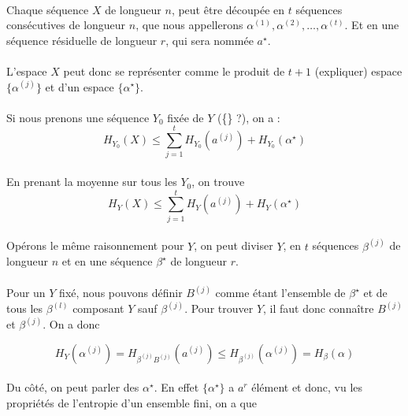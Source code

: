	\paragraph{}
	Chaque séquence $X$ de longueur $n$, peut être découpée en $t$ séquences consécutives de longueur $n$, que nous appellerons $\alpha^{(1)}, \alpha^{(2)}, \dots, \alpha^{(t)}$.
	Et en une séquence résiduelle de longueur $r$, qui sera nommée $a^\star$.
	
	\paragraph{}
	L'espace ${X}$ peut donc se représenter comme le produit de $t+1$ (expliquer) espace $\{\alpha^{(j)}\}$ et d'un espace $\{\alpha^\star\}$.
	
	\paragraph{}
	Si nous prenons une séquence $Y_0$ fixée de $Y$ (\{\} ?), on a :
	\[H_{Y_0}(X)\le \sum_{j=1}^tH_{Y_0}\left(a^{(j)}\right)+H_{Y_0}(\alpha^\star)\]
	
	\paragraph{}
	En prenant la moyenne sur tous les $Y_0$, on trouve
	\[H_Y(X)\le \sum_{j=1}^tH_Y\left(a^{(j)}\right)+H_Y(\alpha^\star)\]
	
	\paragraph{}
	Opérons le même raisonnement pour $Y$, on peut diviser $Y$, en $t$ séquences $\beta^{(j)}$ de longueur $n$ et en une séquence ${\beta^\star}$ de longueur $r$. 
	
	\paragraph{}
	Pour un $Y$ fixé, nous pouvons définir $B^{(j)}$ comme étant l'ensemble de $\beta^\star$ et de tous les $\beta^{(l)}$ composant $Y$ sauf $\beta^{(j)}$.
	Pour trouver $Y$, il faut donc connaître $B^{(j)}$ et $\beta^{(j)}$. On a donc
	
	\[H_Y(\alpha^{(j)}) = H_{\beta^{(j)}B^{(j)}}\left(a^{(j)}\right) \le H_{\beta^{(j)}}\left(\alpha^{(j)}\right)=H_\beta(\alpha) \]
	
	\paragraph{}
	Du côté, on peut parler des $\alpha^\star$. En effet $\{\alpha^\star\}$ a $a^r$ élément et donc, vu les propriétés de l'entropie d'un ensemble fini, on a que
	

